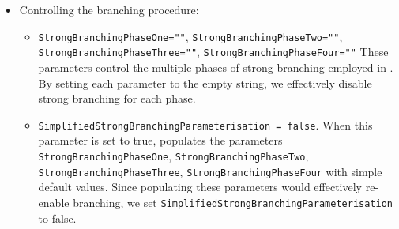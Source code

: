\begin{itemize}
	\item Controlling the branching procedure:
	      \begin{itemize}
		      \item \texttt{StrongBranchingPhaseOne=""}, \texttt{StrongBranchingPhaseTwo=""}, \texttt{StrongBranchingPhaseThree=""}, \texttt{StrongBranchingPhaseFour=""}
		            These parameters control the multiple phases of strong branching employed in \bapcod.
		            By setting each parameter to the empty string, we effectively disable strong branching for each phase.
		      \item \texttt{SimplifiedStrongBranchingParameterisation = false}.
		            When this parameter is set to true, \bapcod populates the parameters \texttt{StrongBranchingPhaseOne}, \texttt{StrongBranchingPhaseTwo}, \texttt{StrongBranchingPhaseThree}, \texttt{StrongBranchingPhaseFour}
		            with simple default values.
		            Since populating these parameters would effectively re-enable branching, we set \texttt{SimplifiedStrongBranchingParameterisation} to false.
	      \end{itemize}


\end{itemize}
